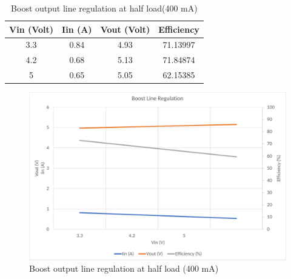 \begin{table}[H]
\centering
\begin{tabular}{c c c c}
\toprule
Vin (Volt) & Iin (A) & Vout (Volt) & Efficiency \\ \midrule\midrule
3.3        & 0.84    & 4.93        & 71.13997   \\ 
4.2        & 0.68    & 5.13        & 71.84874   \\ 
5          & 0.65    & 5.05        & 62.15385   \\ 
\bottomrule
\end{tabular}
\caption{Boost output line regulation at half load(400 mA)}
\label{table:4}
\end{table}

\begin{figure}[H]
	\centering
	\includegraphics[width=0.86\columnwidth]{IMGS/Boost output line regulation at half load (400mA).pdf}
	\caption{Boost output line regulation at half load (400 mA)}
	\label{fig:arch}
\end{figure}


